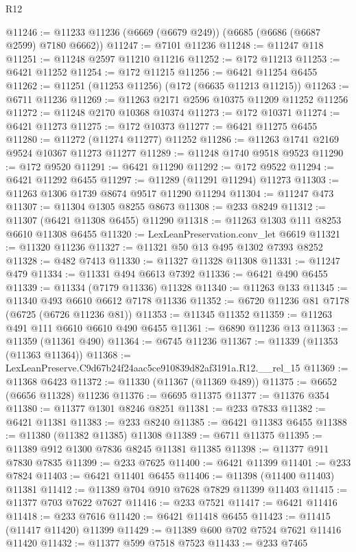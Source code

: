 \begin{lexlean}{R12}
\begin{coremodule}
@11246 := @11233 @11236 (@6669 (@6679 @249)) (@6685 (@6686 (@6687 @2599) @7180 @6662))
@11247 := @7101 @11236
@11248 := @11247 @118
@11251 := @11248 @2597 @11210 @11216
@11252 := @172 @11213
@11253 := @6421 @11252
@11254 := @172 @11215
@11256 := @6421 @11254 @6455
@11262 := @11251 (@11253 @11256) (@172 (@6635 @11213 @11215))
@11263 := @6711 @11236
@11269 := @11263 @2171 @2596 @10375 @11209 @11252 @11256
@11272 := @11248 @2170 @10368 @10374
@11273 := @172 @10371
@11274 := @6421 @11273
@11275 := @172 @10373
@11277 := @6421 @11275 @6455
@11280 := @11272 (@11274 @11277) @11252
@11286 := @11263 @1741 @2169 @9524 @10367 @11273 @11277
@11289 := @11248 @1740 @9518 @9523
@11290 := @172 @9520
@11291 := @6421 @11290
@11292 := @172 @9522
@11294 := @6421 @11292 @6455
@11297 := @11289 (@11291 @11294) @11273
@11303 := @11263 @1306 @1739 @8674 @9517 @11290 @11294
@11304 := @11247 @473
@11307 := @11304 @1305 @8255 @8673
@11308 := @233 @8249
@11312 := @11307 (@6421 @11308 @6455) @11290
@11318 := @11263 @1303 @111 @8253 @6610 @11308 @6455
@11320 := LexLeanPreservation.conv_let @6619
@11321 := @11320 @11236
@11327 := @11321 @50 @13 @495 @1302 @7393 @8252
@11328 := @482 @7413
@11330 := @11327 @11328 @11308
@11331 := @11247 @479
@11334 := @11331 @494 @6613 @7392
@11336 := @6421 @490 @6455
@11339 := @11334 (@7179 @11336) @11328
@11340 := @11263 @133
@11345 := @11340 @493 @6610 @6612 @7178 @11336
@11352 := @6720 @11236 @81 @7178 (@6725 (@6726 @11236 @81))
@11353 := @11345 @11352
@11359 := @11263 @491 @111 @6610 @6610 @490 @6455
@11361 := @6890 @11236 @13
@11363 := @11359 (@11361 @490)
@11364 := @6745 @11236
@11367 := @11339 (@11353 (@11363 @11364))
@11368 := LexLeanPreserve.C9d67b24f24aac5ce910839d82af3191a.R12.__rel_15
@11369 := @11368 @6423
@11372 := @11330 (@11367 (@11369 @489))
@11375 := @6652 (@6656 @11328) @11236
@11376 := @6695 @11375
@11377 := @11376 @354
@11380 := @11377 @1301 @8246 @8251
@11381 := @233 @7833
@11382 := @6421 @11381
@11383 := @233 @8240
@11385 := @6421 @11383 @6455
@11388 := @11380 (@11382 @11385) @11308
@11389 := @6711 @11375
@11395 := @11389 @912 @1300 @7836 @8245 @11381 @11385
@11398 := @11377 @911 @7830 @7835
@11399 := @233 @7625
@11400 := @6421 @11399
@11401 := @233 @7824
@11403 := @6421 @11401 @6455
@11406 := @11398 (@11400 @11403) @11381
@11412 := @11389 @704 @910 @7628 @7829 @11399 @11403
@11415 := @11377 @703 @7622 @7627
@11416 := @233 @7521
@11417 := @6421 @11416
@11418 := @233 @7616
@11420 := @6421 @11418 @6455
@11423 := @11415 (@11417 @11420) @11399
@11429 := @11389 @600 @702 @7524 @7621 @11416 @11420
@11432 := @11377 @599 @7518 @7523
@11433 := @233 @7465

\end{coremodule}
\end{lexlean}
